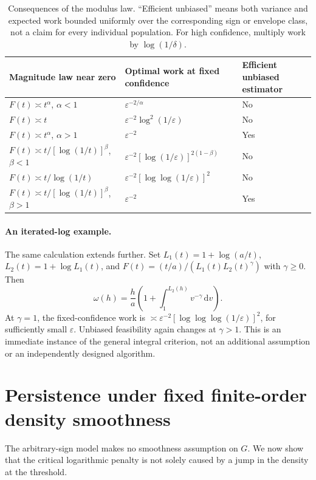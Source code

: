 \begin{table}[tb]
\centering\small
\begin{tabularx}{\linewidth}{@{}lXl@{}}\toprule
Magnitude law near zero & Optimal work at fixed confidence & Efficient unbiased estimator\\\midrule
$F(t)\asymp t^\alpha$, $\alpha<1$ & $\varepsilon^{-2/\alpha}$ & No\\
$F(t)\asymp t$ & $\varepsilon^{-2}\log^2(1/\varepsilon)$ & No\\
$F(t)\asymp t^\alpha$, $\alpha>1$ & $\varepsilon^{-2}$ & Yes\\
$F(t)\asymp t/[\log(1/t)]^\beta$, $\beta<1$ &
$\varepsilon^{-2}[\log(1/\varepsilon)]^{2(1-\beta)}$ & No\\
$F(t)\asymp t/\log(1/t)$ & $\varepsilon^{-2}[\log\log(1/\varepsilon)]^2$ & No\\
$F(t)\asymp t/[\log(1/t)]^\beta$, $\beta>1$ & $\varepsilon^{-2}$ & Yes\\\bottomrule
\end{tabularx}
\caption{Consequences of the modulus law. ``Efficient unbiased'' means both
variance and expected work bounded uniformly over the corresponding sign or
envelope class, not a claim for every individual population. For high
confidence, multiply work by $\log(1/\delta)$.}
\label{tab:rates}
\end{table}

\paragraph{An iterated-log example.}
The same calculation extends further. Set
$L_1(t)=1+\log(a/t)$, $L_2(t)=1+\log L_1(t)$, and
$F(t)=(t/a)/(L_1(t)L_2(t)^\gamma)$ with $\gamma\ge0$.
Then
\[
 \omega(h)=\frac ha\left(1+\int_1^{L_2(h)}v^{-\gamma}\,\mathrm dv\right).
\]
At $\gamma=1$, the fixed-confidence work is
$\asymp\varepsilon^{-2}[\log\log\log(1/\varepsilon)]^2$, for sufficiently
small $\varepsilon$. Unbiased feasibility again changes at $\gamma>1$.
This is an immediate instance of the general integral criterion, not an
additional assumption or an independently designed algorithm.

\section{Persistence under fixed finite-order density smoothness}
\label{sec:smooth}
The arbitrary-sign model makes no smoothness assumption on $G$. We now
show that the critical logarithmic penalty is not solely caused by a
jump in the density at the threshold.

